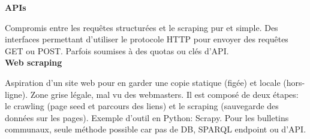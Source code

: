 \textbf{APIs}

Compromis entre les requêtes structurées et le scraping pur et simple.
Des interfaces permettant d'utiliser le protocole HTTP pour envoyer des requêtes GET ou POST.
Parfois soumises à des quotas ou clés d'API.\\

\textbf{Web scraping}

Aspiration d'un site web pour en garder une copie statique (figée) et locale (hors-ligne).
Zone grise légale, mal vu des webmasters.
Il est composé de deux étapes: le crawling (page seed et parcours des liens) et le scraping (sauvegarde des données sur les pages).
Exemple d'outil en Python: Scrapy.
Pour les bulletins communaux, seule méthode possible car pas de DB, SPARQL endpoint ou d'API.
